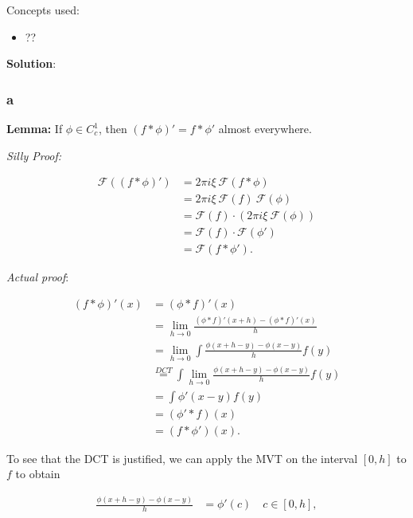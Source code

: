 \begin{solution}

Concepts used:

\begin{itemize}
\tightlist
\item
  ??
\end{itemize}

\textbf{Solution}:

\hypertarget{a-18}{%
\subsubsection{a}\label{a-18}}

\textbf{Lemma:} If \(\phi \in C_c^1\), then
\((f \ast \phi)' = f \ast \phi'\) almost everywhere.

\emph{Silly Proof:}

\begin{align*}
\mathcal{F}(
    (f \ast \phi)'
 )
&= 2\pi i \xi ~\mathcal{F}(f\ast \phi) \\
&= 2\pi i \xi ~ \mathcal{F}(f) ~ \mathcal{F}(\phi) \\
&= \mathcal{F}(f) \cdot \left( 2\pi i \xi ~\mathcal{F}(\phi)\right) \\
&= \mathcal{F}(f) \cdot \mathcal{F}(\phi') \\
&= \mathcal{F}(f\ast \phi')
.\end{align*}

\emph{Actual proof}:

\begin{align*}
(f\ast \phi)'(x)
&= (\phi\ast f)'(x) \\
&= \lim_{h\to 0} \frac{(\phi\ast f)'(x+h) - (\phi\ast f)'(x)}{h} \\
&= \lim_{h\to 0} \int \frac{\phi(x + h - y) - \phi(x - y)}{h} f(y) \\
&\overset{DCT}=  \int \lim_{h\to 0} \frac{\phi(x + h - y) - \phi(x - y)}{h} f(y) \\
&= \int \phi'(x-y) f(y) \\
&= (\phi' \ast f)(x) \\
&= (f \ast \phi')(x)
.\end{align*}

To see that the DCT is justified, we can apply the MVT on the interval
\([0, h]\) to \(f\) to obtain

\begin{align*}
\frac{\phi(x + h - y) - \phi(x - y)}{h}
&= \phi'(c) \quad c\in [0, h]
,\end{align*}


\end{solution}
